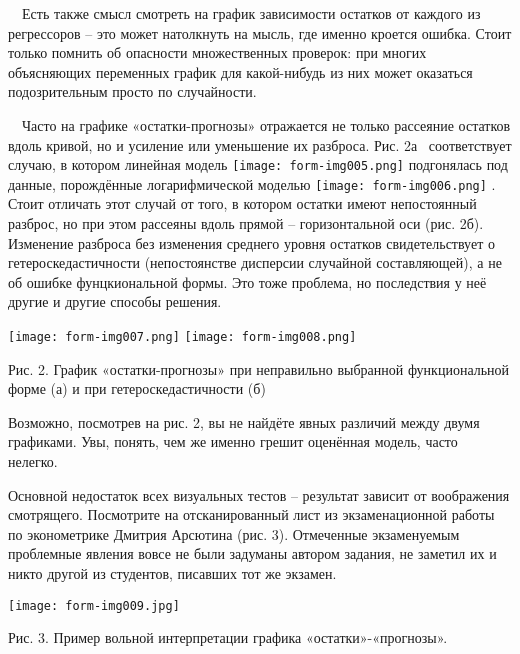 \documentclass[a4paper]{article}
\begin{document}
\bigskip

\ \ Есть также смысл смотреть на график зависимости остатков от каждого из регрессоров – это может натолкнуть на мысль, где именно кроется ошибка. Стоит только помнить об опасности множественных проверок: при многих объясняющих переменных график для какой-нибудь из них может оказаться подозрительным просто по случайности.

\ \ Часто на графике «остатки-прогнозы» отражается не только рассеяние остатков вдоль кривой, но и усиление или уменьшение их разброса. Рис. 2а \ соответствует случаю, в котором линейная модель  \texttt{[image: form-img005.png]}  подгонялась под данные, порождённые логарифмической моделью  \texttt{[image: form-img006.png]} . Стоит отличать этот случай от того, в котором остатки имеют непостоянный разброс, но при этом рассеяны вдоль прямой – горизонтальной оси (рис. 2б). Изменение разброса без изменения среднего уровня остатков свидетельствует о гетероскедастичности (непостоянстве дисперсии случайной составляющей), а не об ошибке фунцкиональной формы. Это тоже проблема, но последствия у неё другие и другие способы решения.

 \texttt{[image: form-img007.png]}   \texttt{[image: form-img008.png]} 

{\centering
Рис. 2. График «остатки-прогнозы» при неправильно выбранной функциональной форме (а) и при гетероскедастичности (б)
\par}


\bigskip

Возможно, посмотрев на рис. 2, вы не найдёте явных различий между двумя графиками. Увы, понять, чем же именно грешит оценённая модель, часто нелегко.

Основной недостаток всех визуальных тестов – результат зависит от воображения смотрящего. Посмотрите на отсканированный лист из экзаменационной работы по эконометрике Дмитрия Арсютина (рис. 3). Отмеченные экзаменуемым проблемные явления вовсе не были задуманы автором задания, не заметил их и никто другой из студентов, писавших тот же экзамен.

{\centering  \texttt{[image: form-img009.jpg]} \par}
{\centering
Рис. 3. Пример вольной интерпретации графика «остатки»-«прогнозы».
\par}


\bigskip
\end{document}
